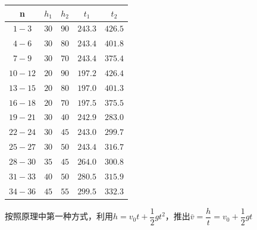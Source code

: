 \documentclass[a4paper]{ltxdoc}
\begin{document}
\begin{multicols}{2}
    \begin{tabular}{|c|c|c|c|c|}
        \hline \textbf{n} & \textbf{$h_1$} & \textbf{$h_2$} & \textbf{$t_1$} & \textbf{$t_2$} \\
        \hline $1-3$        & $30$                       & $90$           & $243.3$                   & $426.5$        \\
        \hline $4-6$        & $30$                       & $80$           & $243.4$                   & $401.8$        \\
        \hline $7-9$        & $30$                       & $70$           & $243.4$                   & $375.4$        \\
        \hline $10-12$       & $20$                       & $90$           & $197.2$                   & $426.4$        \\
        \hline $13-15$       & $20$                       & $80$           & $197.0$                   & $401.3$        \\
        \hline $16-18$       & $20$                       & $70$           & $197.5$                   & $375.5$        \\
        \hline $19-21$       & $30$                       & $40$           & $242.9$                   & $283.0$        \\
        \hline $22-24$       & $30$                       & $45$           & $243.0$                   & $299.7$        \\
        \hline $25-27$       & $30$                       & $50$           & $243.4$                   & $316.7$        \\
        \hline $28-30$       & $35$                       & $45$           & $264.0$                   & $300.8$        \\
        \hline $31-33$       & $40$                       & $50$           & $280.5$                   & $315.9$        \\
        \hline $34-36$       & $45$                       & $55$           & $299.5$                   & $332.3$        \\
        \hline
    \end{tabular}


    \bigskip
    按照原理中第一种方式，利用$h=v_0 t + \dfrac 12 gt^2$，推出$\bar v=\dfrac h t = v_0 +\dfrac{1}{2} g t$


\end{multicols}
\end{document}
